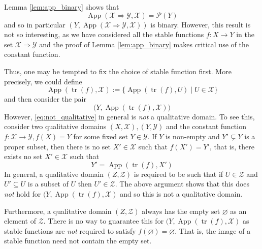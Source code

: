 \documentclass[12pt]{article}
\theoremstyle{plain}
\theoremstyle{definition}
\newcommand{\scr}[1]{\mathscr{#1}}
\newcommand{\call}[1]{\mathcal{#1}}
\newcommand{\lto}{\longrightarrow}
\begin{document}
	Lemma \ref{lem:app_binary} shows that 
	\begin{equation}
	\operatorname{App}(\scr{X} \Rightarrow \scr{Y}, \scr{X}) = \call{P}(Y)
	\end{equation}
and so in particular $(Y, \operatorname{App}(\scr{X} \Rightarrow \scr{Y}, \scr{X}))$ is binary. However, this result is not so interesting, as we have considered all the stable functions $f: X \lto Y$ in the set $\scr{X} \Rightarrow \scr{Y}$ and the proof of Lemma \ref{lem:app_binary} makes critical use of the constant function.

Thus, one may be tempted to fix the choice of stable function first. More precisely, we could define
\begin{equation}
	\operatorname{App}(\operatorname{tr}(f),\scr{X}) := \{ \operatorname{App}(\operatorname{tr}(f),U) \mid U \in \scr{X} \}
	\end{equation}
and then consider the pair
\begin{equation}\label{eq:not_qualitative}
	\big(Y,\operatorname{App}(\operatorname{tr}(f),\scr{X})\big)
	\end{equation}
However, \eqref{eq:not_qualitative} in general is \emph{not} a qualitative domain. To see this, consider two qualitative domains $(X, \scr{X}), (Y, \scr{Y})$ and the constant function $f: \scr{X} \lto \scr{Y}, f(X) = Y$ for some fixed set $Y \in \scr{Y}$. If $Y$ is non-empty and $Y' \subsetneq Y$ is a proper subset, then there is no set $X' \in \scr{X}$ such that $f(X') = Y'$, that is, there exists no set $X' \in \scr{X}$ such that
\begin{equation}
	Y' = \operatorname{App}(\operatorname{tr}(f), X')
	\end{equation}
In general, a qualitative domain $(Z, \scr{Z})$ is required to be such that if $U \in \scr{Z}$ and $U' \subseteq U$ is a subset of $U$ then $U' \in \scr{Z}$. The above argument shows that this does \emph{not} hold for $\big(Y, \operatorname{App}(\operatorname{tr}(f), \scr{X})$ and so this is not a qualitative domain.

Furthermore, a qualitative domain $(Z, \scr{Z})$ always has the empty set $\varnothing$ as an element of $\scr{Z}$. There is no way to guarantee this for $\big(Y, \operatorname{App}(\operatorname{tr}(f), \scr{X})$ as stable functions are \emph{not} required to satisfy $f(\varnothing) = \varnothing$. That is, the image of a stable function need not contain the empty set.
	
\end{document}
